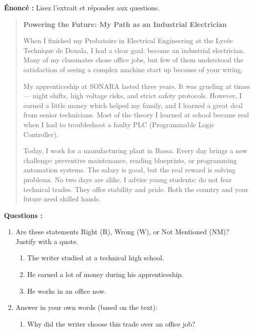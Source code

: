 \documentclass[11pt]{article}
\newcommand{\cle}[1]{{\popxbold\color{popdark}#1}}
\begin{document}
\begin{exoresolu}
    \textbf{Énoncé :} Lisez l'extrait et répondez aux questions.
    \begin{quote}
        \textbf{Powering the Future: My Path as an Industrial Electrician}
        \par
        When I finished my Probatoire in Electrical Engineering at the Lycée Technique de Douala, I had a clear goal: become an industrial electrician. Many of my classmates chose office jobs, but \cle{few} of them understood the satisfaction of seeing a complex machine start up because of your wiring.
        \par
        My \cle{apprenticeship} at SONARA lasted three years. It was \cle{grueling} at times — night shifts, high voltage risks, and strict safety protocols. However, I earned \cle{a little} money which helped my family, and I learned \cle{a great deal} from senior technicians. \cle{Most of} the theory I learned at school became real when I had to troubleshoot a faulty PLC (Programmable Logic Controller).
        \par
        Today, I work for a manufacturing plant in Bassa. \cle{Every} day brings a new challenge: preventive maintenance, reading blueprints, or programming automation systems. The salary is good, but \cle{the real reward} is solving problems. \cle{No} two days are alike. I advise young students: \cle{do not} fear technical trades. They offer stability and pride. \cle{Both} the country and your future need skilled hands.
    \end{quote}
    \textbf{Questions :}
    \begin{enumerate}
        \item Are these statements Right (R), Wrong (W), or Not Mentioned (NM)? Justify with a quote.
              \begin{enumerate}
                  \item The writer studied at a technical high school.
                  \item He earned a lot of money during his apprenticeship.
                  \item He works in an office now.
              \end{enumerate}
        \item Answer in your own words (based on the text):
              \begin{enumerate}
                  \item Why did the writer choose this trade over an office job?

\end{enumerate}
\end{enumerate}
\end{exoresolu}
\end{document}
